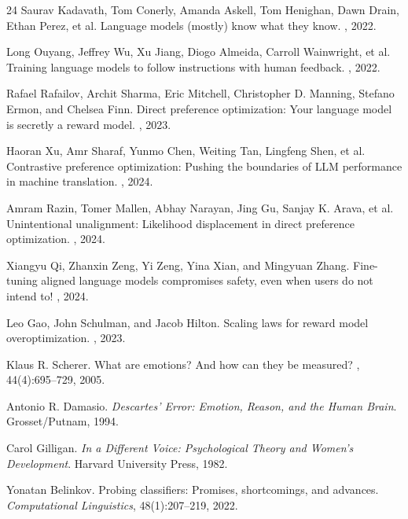 \documentclass[11pt]{article}
\begin{document}
\begin{thebibliography}{24}
Saurav Kadavath, Tom Conerly, Amanda Askell, Tom Henighan, Dawn Drain, Ethan Perez, et al.
\newblock Language models (mostly) know what they know.
, 2022.

Long Ouyang, Jeffrey Wu, Xu Jiang, Diogo Almeida, Carroll Wainwright, et al.
\newblock Training language models to follow instructions with human feedback.
, 2022.

Rafael Rafailov, Archit Sharma, Eric Mitchell, Christopher D. Manning, Stefano Ermon, and Chelsea Finn.
\newblock Direct preference optimization: Your language model is secretly a reward model.
, 2023.

Haoran Xu, Amr Sharaf, Yunmo Chen, Weiting Tan, Lingfeng Shen, et al.
\newblock Contrastive preference optimization: Pushing the boundaries of {LLM} performance in machine translation.
, 2024.

Amram Razin, Tomer Mallen, Abhay Narayan, Jing Gu, Sanjay K. Arava, et al.
\newblock Unintentional unalignment: Likelihood displacement in direct preference optimization.
, 2024.

Xiangyu Qi, Zhanxin Zeng, Yi Zeng, Yina Xian, and Mingyuan Zhang.
\newblock Fine-tuning aligned language models compromises safety, even when users do not intend to!
, 2024.

Leo Gao, John Schulman, and Jacob Hilton.
\newblock Scaling laws for reward model overoptimization.
, 2023.

Klaus R. Scherer.
\newblock What are emotions? And how can they be measured?
, 44(4):695--729, 2005.

Antonio R. Damasio.
\newblock \emph{Descartes' Error: Emotion, Reason, and the Human Brain}.
\newblock Grosset/Putnam, 1994.

Carol Gilligan.
\newblock \emph{In a Different Voice: Psychological Theory and Women's Development}.
\newblock Harvard University Press, 1982.

Yonatan Belinkov.
\newblock Probing classifiers: Promises, shortcomings, and advances.
\newblock \emph{Computational Linguistics}, 48(1):207--219, 2022.


\end{thebibliography}
\end{document}
